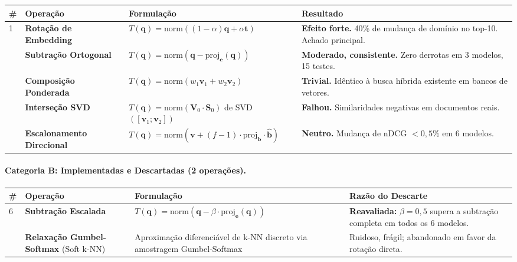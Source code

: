 \documentclass{article}
\begin{document}
\begin{longtable}{>{\raggedright}p{0.3cm} >{\raggedright}p{2.8cm} >{\raggedright}p{5.5cm} p{4.5cm}}
\toprule
\# & Operação & Formulação & Resultado \\
\midrule
\endhead
1 & \textbf{Rotação de Embedding} & $T(\mathbf{q}) = \text{norm}((1-\alpha)\mathbf{q} + \alpha\mathbf{t})$ & \textbf{Efeito forte.} 40\% de mudança de domínio no top-10. Achado principal. \\
\addlinespace
2 & \textbf{Subtração Ortogonal} & $T(\mathbf{q}) = \text{norm}(\mathbf{q} - \text{proj}_\mathbf{e}(\mathbf{q}))$ & \textbf{Moderado, consistente.} Zero derrotas em 3 modelos, 15 testes. \\
\addlinespace
3 & \textbf{Composição Ponderada} & $T(\mathbf{q}) = \text{norm}(w_1\mathbf{v}_1 + w_2\mathbf{v}_2)$ & \textbf{Trivial.} Idêntico à busca híbrida existente em bancos de vetores. \\
\addlinespace
4 & \textbf{Interseção SVD} & $T(\mathbf{q}) = \text{norm}(\mathbf{V}_0 \cdot \mathbf{S}_0)$ de SVD$([\mathbf{v}_1; \mathbf{v}_2])$ & \textbf{Falhou.} Similaridades negativas em documentos reais. \\
\addlinespace
5 & \textbf{Escalonamento Direcional} & $T(\mathbf{q}) = \text{norm}(\mathbf{v} + (f{-}1) \cdot \text{proj}_\mathbf{b} \cdot \hat{\mathbf{b}})$ & \textbf{Neutro.} Mudança de nDCG $< 0{,}5\%$ em 6 modelos. \\
\bottomrule
\end{longtable}

\paragraph{Categoria B: Implementadas e Descartadas (2 operações).}

\begin{longtable}{>{\raggedright}p{0.3cm} >{\raggedright}p{2.8cm} >{\raggedright}p{5.5cm} p{4.5cm}}
\toprule
\# & Operação & Formulação & Razão do Descarte \\
\midrule
\endhead
6 & \textbf{Subtração Escalada} & $T(\mathbf{q}) = \text{norm}(\mathbf{q} - \beta \cdot \text{proj}_\mathbf{e}(\mathbf{q}))$ & \textbf{Reavaliada:} $\beta = 0{,}5$ supera a subtração completa em todos os 6 modelos. \\
\addlinespace
7 & \textbf{Relaxação Gumbel-Softmax} (Soft k-NN) & Aproximação diferenciável de k-NN discreto via amostragem Gumbel-Softmax & Ruidoso, frágil; abandonado em favor da rotação direta. \\
\bottomrule
\end{longtable}
\end{document}
